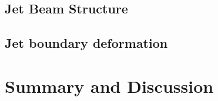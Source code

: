 \subsection{Jet Beam Structure}
\label{subsec:j_beam_struc}
\subsection{Jet boundary deformation}
\label{subsec:j_boundary_Def}
\section{Summary and Discussion}
\label{sec:c2discussion}
     
